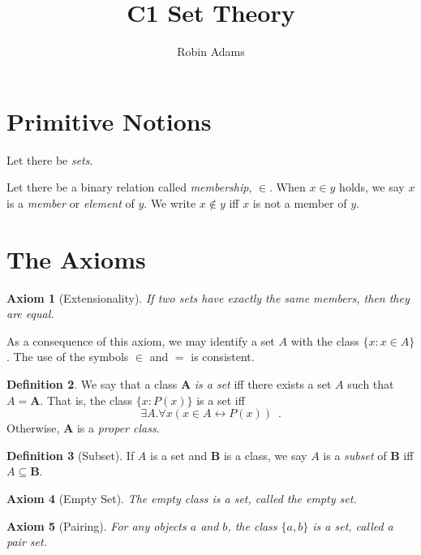 \documentclass{article}
\title{C1 Set Theory}
\author{Robin Adams}
\newtheorem{axiom}{Axiom}
\theoremstyle{definition}
\newtheorem{definition}[axiom]{Definition}
\begin{document}
    \maketitle

    \section{Primitive Notions}

    Let there be \emph{sets}.

    Let there be a binary relation called \emph{membership}, $\in$. When $x \in y$ holds, we say $x$ is a
    \emph{member} or \emph{element} of $y$. We write $x \notin y$ iff $x$ is not a member of $y$.

    \section{The Axioms}

    \begin{axiom}[Extensionality]
        If two sets have exactly the same members, then they are equal.
    \end{axiom}

    As a consequence of this axiom, we may identify a set $A$ with the class $\{ x : x \in A \}$. The use of
    the symbols $\in$ and $=$ is consistent.

    \begin{definition}
    We say that a class $\mathbf{A}$ \emph{is a set} iff there exists a set $A$ such that $A = \mathbf{A}$.
    That is, the class $\{ x : P(x) \}$ is a set iff
    \[ \exists A. \forall x (x \in A \leftrightarrow P(x)) \enspace . \]
    Otherwise, $\mathbf{A}$ is a \emph{proper class}.
    \end{definition}

    \begin{definition}[Subset]
        If $A$ is a set and $\mathbf{B}$ is a class, we say $A$ is a \emph{subset} of $\mathbf{B}$
        iff $A \subseteq \mathbf{B}$.
    \end{definition}

    \begin{axiom}[Empty Set]
        The empty class is a set, called the \emph{empty set}.
    \end{axiom}

    \begin{axiom}[Pairing]
        For any objects $a$ and $b$, the class $\{a,b\}$ is a set, called a \emph{pair set}.
    \end{axiom}
\end{document}
